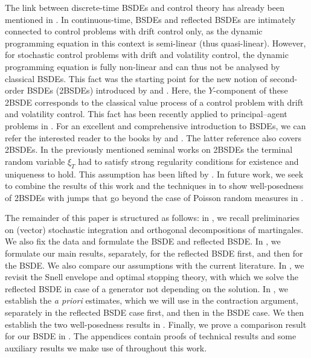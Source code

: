 \documentclass[10pt]{article} %
\newcommand{\1}{\mathbf{1}}
\begin{document}
\medskip
The link between discrete-time BSDEs and control theory has already been mentioned in \citeauthor*{cohen2012existence} \cite{cohen2010general2, cohen2011backward, cohen2012existence}. In continuous-time, BSDEs and reflected BSDEs are intimately connected to control problems with drift control only, as the dynamic programming equation in this context is semi-linear (thus quasi-linear). However, for stochastic control problems with drift and volatility control, the dynamic programming equation is fully non-linear and can thus not be analysed by classical BSDEs. This fact was the starting point for the new notion of second-order BSDEs (2BSDEs) introduced by \citeauthor*{cheridito2007second} \cite{cheridito2007second} and \citeauthor*{soner2011quasi} \cite{soner2011quasi,soner2012wellposedness}. Here, the $Y$-component of these 2BSDE corresponds to the classical value process of a control problem with drift and volatility control. This fact has been recently applied to principal--agent problems in \cite{cvitanic2018dynamic}. For an excellent and comprehensive introduction to BSDEs, we can refer the interested reader to the books by \citeauthor*{touzi2013optimal} \cite{touzi2013optimal} and \citeauthor*{zhang2017backward} \cite{zhang2017backward}. The latter reference also covers 2BSDEs. In the previously mentioned seminal works \cite{soner2011quasi,soner2012wellposedness} on 2BSDEs the terminal random variable $\xi_T$ had to satisfy strong regularity conditions for existence and uniqueness to hold. This assumption has been lifted by \citeauthor*{possamai2018stochastic} \cite{possamai2018stochastic}. In future work, we seek to combine the results of this work and the techniques in \cite{possamai2018stochastic} to show well-posedness of 2BSDEs with jumps that go beyond the case of Poisson random measures in \citeauthor*{kazi2015second} \cite{kazi2015second,kazi2015second2}.

\medskip
The remainder of this paper is structured as follows: in , we recall preliminaries on (vector) stochastic integration and orthogonal decompositions of martingales. We also fix the data and formulate the BSDE and reflected BSDE. In , we formulate our main results, separately, for the reflected BSDE first, and then for the BSDE. We also compare our assumptions with the current literature. In , we revisit the Snell envelope and optimal stopping theory, with which we solve the reflected BSDE in case of a generator not depending on the solution. In , we establish the \emph{a priori} estimates, which we will use in the contraction argument, separately in the reflected BSDE case first, and then in the BSDE case. We then establish the two well-posedness results in . Finally, we prove a comparison result for our BSDE in . The appendices contain proofs of technical results and some auxiliary results we make use of throughout this work. 
\end{document}
